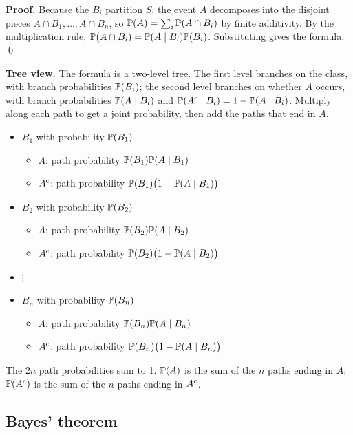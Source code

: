 \textbf{Proof.} Because the $B_i$ partition $S$, the event $A$ decomposes into the disjoint
pieces $A \cap B_1, \dots, A \cap B_n$, so $\mathbb{P}(A) = \sum_i \mathbb{P}(A \cap B_i)$ by
finite additivity. By the multiplication rule, $\mathbb{P}(A \cap B_i) = \mathbb{P}(A \mid B_i)\mathbb{P}(B_i)$.
Substituting gives the formula. \qed

\textbf{Tree view.} The formula is a two-level tree. The first level branches on the class,
with branch probabilities $\mathbb{P}(B_i)$; the second level branches on whether $A$ occurs,
with branch probabilities $\mathbb{P}(A \mid B_i)$ and $\mathbb{P}(A^{\mathrm{c}} \mid B_i) = 1 - \mathbb{P}(A \mid B_i)$.
Multiply along each path to get a joint probability, then add the paths that end in $A$.
\begin{itemize}[nosep,leftmargin=2em]
  \item $B_1$ with probability $\mathbb{P}(B_1)$
  \begin{itemize}[nosep]
    \item $A$: path probability $\mathbb{P}(B_1)\mathbb{P}(A \mid B_1)$
    \item $A^{\mathrm{c}}$: path probability $\mathbb{P}(B_1)\bigl(1 - \mathbb{P}(A \mid B_1)\bigr)$
  \end{itemize}
  \item $B_2$ with probability $\mathbb{P}(B_2)$
  \begin{itemize}[nosep]
    \item $A$: path probability $\mathbb{P}(B_2)\mathbb{P}(A \mid B_2)$
    \item $A^{\mathrm{c}}$: path probability $\mathbb{P}(B_2)\bigl(1 - \mathbb{P}(A \mid B_2)\bigr)$
  \end{itemize}
  \item $\vdots$
  \item $B_n$ with probability $\mathbb{P}(B_n)$
  \begin{itemize}[nosep]
    \item $A$: path probability $\mathbb{P}(B_n)\mathbb{P}(A \mid B_n)$
    \item $A^{\mathrm{c}}$: path probability $\mathbb{P}(B_n)\bigl(1 - \mathbb{P}(A \mid B_n)\bigr)$
  \end{itemize}
\end{itemize}
The $2n$ path probabilities sum to 1. $\mathbb{P}(A)$ is the sum of the $n$ paths ending in $A$;
$\mathbb{P}(A^{\mathrm{c}})$ is the sum of the $n$ paths ending in $A^{\mathrm{c}}$.

\subsection{Bayes' theorem}

